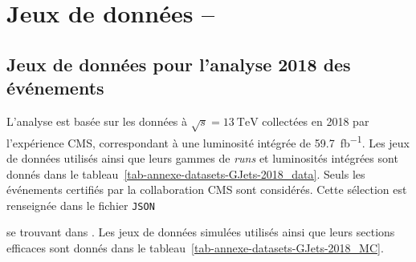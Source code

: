 \chapter{Jeux de données -- \Gjets}\label{annexe-datasets-GJets}

\section{Jeux de données pour l'analyse 2018 des événements \Gjets}
L'analyse est basée sur les données à $\sqrt{s}=\SI{13}{\TeV}$ collectées en 2018 par l'expérience CMS, correspondant à une luminosité intégrée de \SI{59.7}{\femto\barn^{-1}}.
Les jeux de données utilisés ainsi que leurs gammes de \emph{runs} et luminosités intégrées sont donnés dans le tableau~\ref{tab-annexe-datasets-GJets-2018_data}.
Seuls les événements certifiés par la collaboration CMS sont considérés. Cette sélection est renseignée dans le fichier \texttt{JSON}
\begin{center}
\end{center}
se trouvant dans .
Les jeux de données simulées utilisés ainsi que leurs sections efficaces sont donnés dans le tableau~\ref{tab-annexe-datasets-GJets-2018_MC}.

